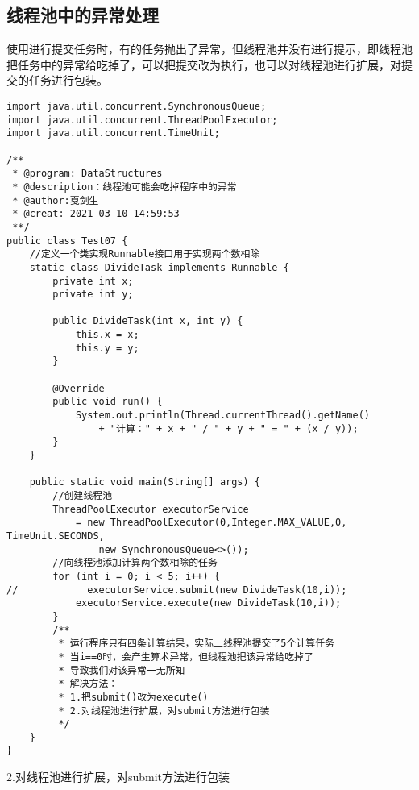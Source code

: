\documentclass[a4paper]{report}
\begin{document}
\subsection{线程池中的异常处理}
使用进行提交任务时，有的任务抛出了异常，但线程池并没有进行提示，即线程池把任务中的异常给吃掉了，可以把提交改为执行，也可以对线程池进行扩展，对提交的任务进行包装。
\begin{Verbatim}[frame=single,numbersep=5pt,xleftmargin=1.5em,xrightmargin=1.5em]
import java.util.concurrent.SynchronousQueue;
import java.util.concurrent.ThreadPoolExecutor;
import java.util.concurrent.TimeUnit;

/**
 * @program: DataStructures
 * @description：线程池可能会吃掉程序中的异常
 * @author:戛剑生
 * @creat: 2021-03-10 14:59:53
 **/
public class Test07 {
    //定义一个类实现Runnable接口用于实现两个数相除
    static class DivideTask implements Runnable {
        private int x;
        private int y;

        public DivideTask(int x, int y) {
            this.x = x;
            this.y = y;
        }

        @Override
        public void run() {
            System.out.println(Thread.currentThread().getName()
                + "计算：" + x + " / " + y + " = " + (x / y));
        }
    }

    public static void main(String[] args) {
        //创建线程池
        ThreadPoolExecutor executorService
            = new ThreadPoolExecutor(0,Integer.MAX_VALUE,0, TimeUnit.SECONDS,
                new SynchronousQueue<>());
        //向线程池添加计算两个数相除的任务
        for (int i = 0; i < 5; i++) {
//            executorService.submit(new DivideTask(10,i));
            executorService.execute(new DivideTask(10,i));
        }
        /**
         * 运行程序只有四条计算结果，实际上线程池提交了5个计算任务
         * 当i==0时，会产生算术异常，但线程池把该异常给吃掉了
         * 导致我们对该异常一无所知
         * 解决方法：
         * 1.把submit()改为execute()
         * 2.对线程池进行扩展，对submit方法进行包装
         */
    }
}\end{Verbatim}

2.对线程池进行扩展，对submit方法进行包装
\end{document}
